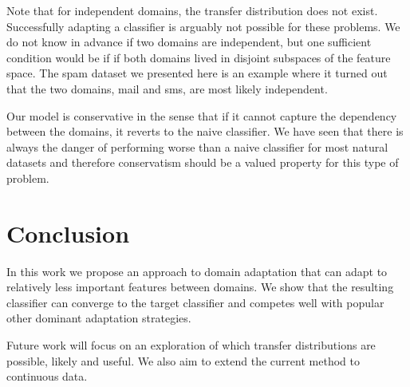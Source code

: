 \documentclass[twoside,11pt]{article}
\begin{document}
Note that for independent domains, the transfer distribution does not exist. Successfully adapting a classifier is arguably not possible for these problems. We do not know in advance if two domains are independent, but one sufficient condition would be if if both domains lived in disjoint subspaces of the feature space. The spam dataset we presented here is an example where it turned out that the two domains, mail and sms, are most likely independent.

Our model is conservative in the sense that if it cannot capture the dependency between the domains, it reverts to the naive classifier. We have seen that there is always the danger of performing worse than a naive classifier for most natural datasets and therefore conservatism should be a valued property for this type of problem.

\section{Conclusion}
In this work we propose an approach to domain adaptation that can adapt to relatively less important features between domains. We show that the resulting classifier can converge to the target classifier and competes well with popular other dominant adaptation strategies.

Future work will focus on an exploration of which transfer distributions are possible, likely and useful. We also aim to extend the current method to continuous data.





\vskip 0.2in

\end{document}

